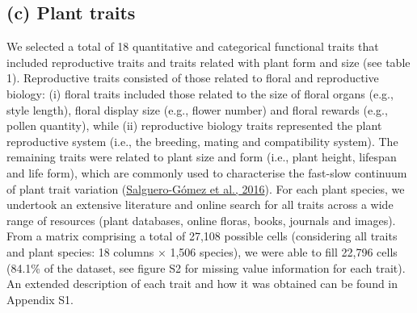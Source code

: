 \documentclass[
  12pt,
  a4paper,
]{article}
\begin{document}
\hypertarget{c-plant-traits}{%
\subsection{(c) Plant traits}\label{c-plant-traits}}

We selected a total of 18 quantitative and categorical functional traits that included reproductive traits and traits related with plant form and size (see table 1). Reproductive traits consisted of those related to floral and reproductive biology: (i) floral traits included those related to the size of floral organs (e.g., style length), floral display size (e.g., flower number) and floral rewards (e.g., pollen quantity), while (ii) reproductive biology traits represented the plant reproductive system (i.e., the breeding, mating and compatibility system). The remaining traits were related to plant size and form (i.e., plant height, lifespan and life form), which are commonly used to characterise the fast-slow continuum of plant trait variation (\protect\hyperlink{ref-salguero2016}{Salguero-Gómez et al., 2016}). For each plant species, we undertook an extensive literature and online search for all traits across a wide range of resources (plant databases, online floras, books, journals and images). From a matrix comprising a total of 27,108 possible cells (considering all traits and plant species: 18 columns × 1,506 species), we were able to fill 22,796 cells (84.1\% of the dataset, see figure S2 for missing value information for each trait). An extended description of each trait and how it was obtained can be found in Appendix S1.

\singlespacing
\end{document}
